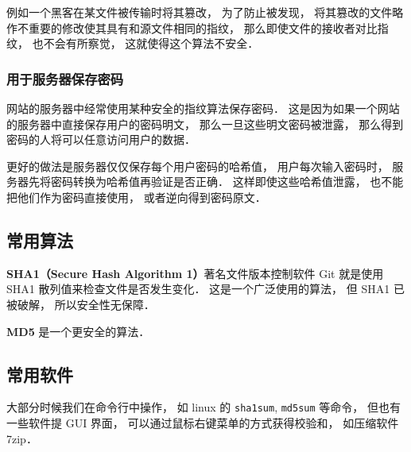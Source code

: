 例如一个黑客在某文件被传输时将其篡改， 为了防止被发现， 将其篡改的文件略作不重要的修改使其具有和源文件相同的指纹， 那么即使文件的接收者对比指纹， 也不会有所察觉， 这就使得这个算法不安全．

\subsubsection{用于服务器保存密码}
网站的服务器中经常使用某种安全的指纹算法保存密码． 这是因为如果一个网站的服务器中直接保存用户的密码明文， 那么一旦这些明文密码被泄露， 那么得到密码的人将可以任意访问用户的数据．

更好的做法是服务器仅仅保存每个用户密码的哈希值， 用户每次输入密码时， 服务器先将密码转换为哈希值再验证是否正确． 这样即使这些哈希值泄露， 也不能把他们作为密码直接使用， 或者逆向得到密码原文．

\subsection{常用算法}
\textbf{SHA1（Secure Hash Algorithm 1）}著名文件版本控制软件 Git %
就是使用 SHA1 散列值来检查文件是否发生变化． 这是一个广泛使用的算法， 但 SHA1 已被破解， 所以安全性无保障．

\textbf{MD5} 是一个更安全的算法．

\subsection{常用软件}
大部分时候我们在命令行中操作， 如 linux 的 \verb|sha1sum|, \verb|md5sum| 等命令， 但也有一些软件提 GUI 界面， 可以通过鼠标右键菜单的方式获得校验和， 如压缩软件 7zip．

